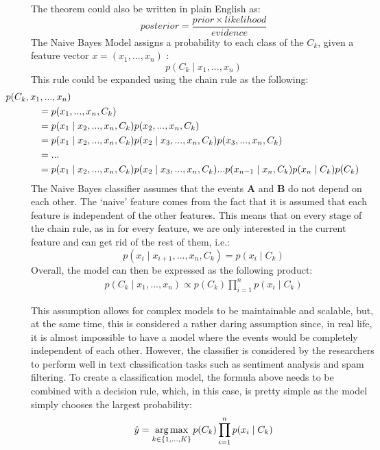     The theorem could also be written in plain English as:
    $$ posterior = \frac{prior \times likelihood}{evidence} $$
    The Naive Bayes Model assigns a probability to each class of the $C_k$, given a feature vector $ x= (x_1, ..., x_n)$ :
    $$p(C_k \mid x_1, ..., x_n)$$
    This rule could be expanded using the chain rule as the following:
    \begin{align}
        \mathclap{p (C_k, x_1, ..., x_n)}  & \notag \\
    &= p(x_1, ..., x_n, C_k)  & \notag \\
    &= p(x_1 \mid x_2, ..., x_n, C_k)p(x_2, ..., x_n, C_k)  & \notag \\
    &= p(x_1 \mid x_2, ..., x_n, C_k)p(x_2 \mid x_3, ..., x_n, C_k)p(x_3, ..., x_n, C_k)  & \notag \\
    &= ...  & \notag \\
    &= p(x_1 \mid x_2, ..., x_n, C_k)p(x_2 \mid x_3, ..., x_n, C_k)...p(x_{n-1} \mid x_n, C_k)p(x_n \mid
    C_k)p(C_k)  & \notag \\
    \end{align}
    The Naive Bayes classifier assumes that the events \textbf{A} and \textbf{B} do not depend on each other.
    The `naive' feature comes from the fact that it is assumed that each feature is independent of the other features. This means that on every stage of the chain rule, as in for every feature, we are only interested in the current feature and can get rid of the rest of them, i.e.:
    $$ p(x_i \mid x_{i+1}, ..., x_n, C_k) = p(x_i \mid C_k) $$
    Overall, the model can then be expressed as the following product:
    \begin{align}
        p(C_k \mid x_1, ..., x_n) \propto p(C_k) \prod_{i=1}^{n} p(x_i \mid C_k)
    \end{align}
   
     This assumption allows for complex models to be maintainable and scalable, but, at the same time, this is considered a rather daring assumption since, in real life, it is almost impossible to have a model where the events would be completely independent of each other. However, the classifier is considered by the researchers to perform well in text classification tasks such as sentiment analysis and spam filtering.
     To create a classification model, the formula above needs to be combined with a decision rule, which, in this case, is pretty simple as the model simply chooses the largest probability:
     \begin{align}
         \hat{y} =  \operatorname*{arg\,max}_{k \in \{1,...,K\}} p(C_k) \prod_{i=1}^{n} p(x_i \mid C_k)
     \end{align}
     
